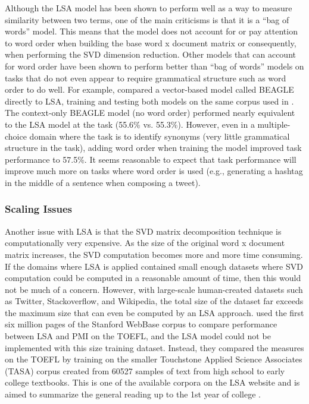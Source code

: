 \documentclass[man,floatsintext,donotrepeattitle]{apa6}
\begin{document}
Although the LSA model has been shown to perform well as a way to measure similarity between two terms, one of the main criticisms is that it is a ``bag of words'' model.
This means that the model does not account for or pay attention to word order when building the base word x document matrix or consequently, when performing the SVD dimension reduction.
Other models that can account for word order have been shown to perform better than ``bag of words'' models on tasks that do not even appear to require grammatical structure such as word order to do well.
For example, \textcite{Jones2007} compared a vector-based model called BEAGLE directly to LSA, training and testing both models on the same corpus used in \textcite{Landauer1997}.
The context-only BEAGLE model (no word order) performed nearly equivalent to the LSA model at the task (55.6\% vs. 55.3\%).
However, even in a multiple-choice domain where the task is to identify synonyms (very little grammatical structure in the task), adding word order when training the model improved task performance to 57.5\%.
It seems reasonable to expect that task performance will improve much more on tasks where word order is used (e.g., generating a hashtag in the middle of a sentence when composing a tweet).

\subsubsection{Scaling Issues}

Another issue with LSA is that the SVD matrix decomposition technique is computationally very expensive.
As the size of the original word x document matrix increases, the SVD computation becomes more and more time consuming.
If the domains where LSA is applied contained small enough datasets where SVD computation could be computed in a reasonable amount of time, then this would not be much of a concern.
However, with large-scale human-created datasets such as Twitter, Stackoverflow, and Wikipedia, the total size of the dataset far exceeds the maximum size that can even be computed by an LSA approach.
\textcite{Budiu2007} used the first six million pages of the Stanford WebBase corpus to compare performance between LSA and PMI on the TOEFL, and the LSA model could not be implemented with this size training dataset.
Instead, they compared the measures on the TOEFL by training on the smaller Touchstone Applied Science Associates (TASA) corpus created from \num{60527} samples of text from high school to early college textbooks.
This is one of the available corpora on the LSA website and is aimed to summarize the general reading up to the 1st year of college \parencite{Budiu2007}.
\end{document}

